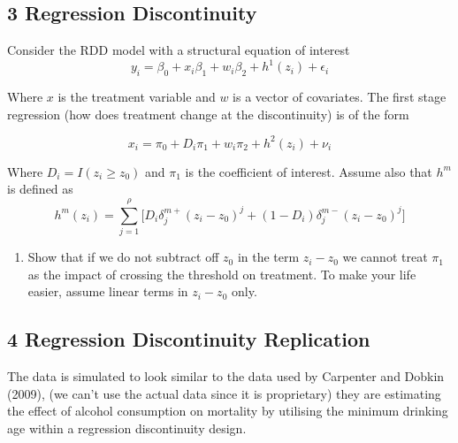 \documentclass[11pt]{article}
\begin{document}
\subsection*{3 Regression Discontinuity}
Consider the RDD model with a structural equation of interest
$$y_i = \beta_0  + x_i \beta_1 + w_i \beta_2 + h^1(z_i) + \epsilon_i$$

Where $x$ is the treatment variable and $w$ is a vector of covariates. The first stage regression (how does treatment change at the discontinuity) is of the form 

$$x_i = \pi_0 + D_i \pi_1 + w_i \pi_2 + h^2(z_i) + \nu_i$$

Where $D_i = I(z_i \ge z_0)$ and $\pi_1$ is the coefficient of interest. Assume also that $h^m$ is defined as
$$h^m(z_i) = \sum_{j=1}^\rho \bigg[D_i \delta_j^{m+}(z_i - z_0)^j + (1 - D_i) \delta_j^{m-}(z_i - z_0)^j \bigg]$$

\begin{enumerate}[label=\alph*)]
    \item Show that if we do not subtract off $z_0$ in the term $z_i - z_0$ we cannot treat $\pi_1$ as the impact of crossing the threshold on treatment. To make your life easier, assume linear terms in $z_i - z_0$ only.
\end{enumerate}

\subsection*{4 Regression Discontinuity Replication}
The data is simulated to look similar to the data used by Carpenter and Dobkin (2009), (we can't use the actual data since it is proprietary) they are estimating the effect of alcohol consumption on mortality by utilising the minimum drinking age within a regression discontinuity design. 
\end{document}

